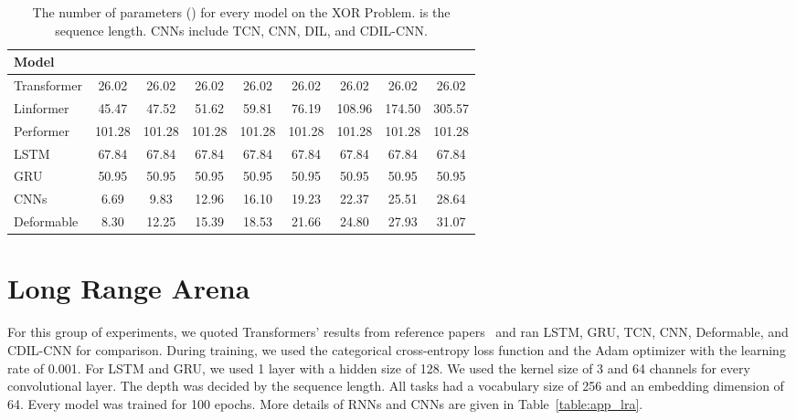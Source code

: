 \documentclass{article}
\begin{document}
\begin{table}[bh]
\centering
\caption{The number of parameters () for every model on the XOR Problem.  is the sequence length. CNNs include TCN, CNN, DIL, and CDIL-CNN.}
\label{table:app_syn}
\renewcommand{\arraystretch}{1.2}
\begin{tabular}{lcccccccc}
\hline
\hline
Model       &    &    &    &    &    &     &    &\\
\hline
Transformer &26.02     &26.02     &26.02     &26.02     &26.02     &26.02     &26.02     &26.02     \\
\hline
Linformer   &45.47     &47.52     &51.62     &59.81     &76.19     &108.96    &174.50    &305.57    \\
\hline
Performer   &101.28    &101.28    &101.28    &101.28    &101.28    &101.28    &101.28    &101.28    \\
\hline
LSTM        &67.84     &67.84     &67.84     &67.84     &67.84     &67.84     &67.84     &67.84     \\
\hline
GRU         &50.95     &50.95     &50.95     &50.95     &50.95     &50.95     &50.95     &50.95     \\
\hline
CNNs        &6.69      &9.83      &12.96     &16.10     &19.23     &22.37     &25.51     &28.64     \\
\hline
Deformable  &8.30      &12.25     &15.39     &18.53     &21.66     &24.80     &27.93     &31.07     \\
\hline
\hline
\end{tabular}
\end{table}


\section{Long Range Arena}
For this group of experiments, we quoted Transformers' results from reference papers~\cite{peng2021random, tay2020long, zhu2021long, xiong2021nystr} and ran LSTM, GRU, TCN, CNN, Deformable, and CDIL-CNN for comparison. During training, we used the categorical cross-entropy loss function and the Adam optimizer with the learning rate of 0.001. For LSTM and GRU, we used 1 layer with a hidden size of 128. We used the kernel size of 3 and 64 channels for every convolutional layer. The depth was decided by the sequence length. All tasks had a vocabulary size of 256 and an embedding dimension of 64. Every model was trained for 100 epochs. More details of RNNs and CNNs are given in Table~\ref{table:app_lra}.
\end{document}
